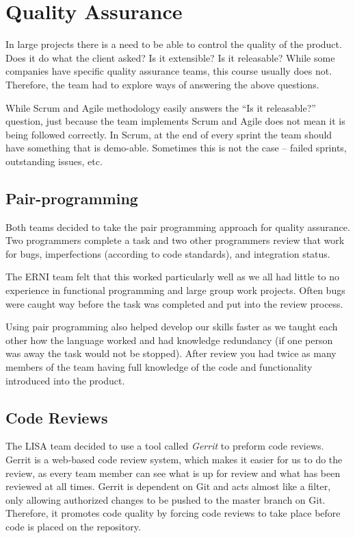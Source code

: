 \section {Quality Assurance}
In large projects there is a need to be able to control the quality of the product. Does it do what the client asked? Is it extensible? Is it releasable? While some companies have specific quality assurance teams, this  course usually does not. Therefore, the team had to explore ways of answering the above questions.

While Scrum and Agile methodology easily answers the ``Is it releasable?'' question, just because the team  implements Scrum and Agile does not mean it is being followed correctly. In Scrum, at the end of every sprint the team should have something that is demo-able. Sometimes this is not the case -- failed sprints, outstanding issues, etc.

\subsection{Pair-programming}

Both teams decided to take the pair programming approach for quality assurance. Two programmers complete a task and two other programmers review that work for bugs, imperfections (according to code standards), and integration status. 

The ERNI team felt that this worked particularly well as we all had little to no experience in functional programming and large group work projects. Often bugs were caught way before the task was completed and put into the review process. 

Using pair programming also helped develop our skills faster as we taught each other how the language worked and had knowledge redundancy (if one person was away the task would not be stopped). After review you had twice as many members of the team having full knowledge of the code and functionality introduced into the product.

\subsection{Code Reviews}

The LISA team decided to use a tool called \textit{Gerrit} to preform code reviews. Gerrit is a web-based code review system, which makes it easier for us to do the review, as every team member can see what is up for review and what has been reviewed at all times. Gerrit is dependent on Git and acts almost like a filter, only allowing authorized changes to be pushed to the master branch on Git. Therefore, it promotes code quality by forcing code reviews to take place before code is placed on the repository.

